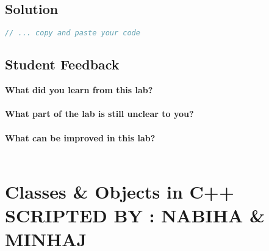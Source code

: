 \documentclass[11pt,fleqn]{book} %
\begin{document}

\newpage
\section{Solution}
\begin{lstlisting}[language=C++]
  // ... copy and paste your code
\end{lstlisting}

\newpage
\section{Student Feedback}
\textbf{What did you learn from this lab?}\\
\noindent\fbox{\parbox{\textwidth}{
  }
}\\
\textbf{What part of the lab is still unclear to you?}\\
\noindent\fbox{\parbox{\textwidth}{
  }
}\\
\textbf{What can be improved in this lab?}\\ 
\noindent\fbox{\parbox{\textwidth}{
  }
}\\

\newpage

\chapter{Classes \& Objects in C++ \hspace{14mm} {\textsc{\small SCRIPTED BY : NABIHA \& MINHAJ}}}
\end{document}
